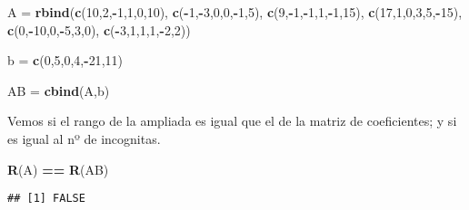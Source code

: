 \documentclass[
]{article}
\newenvironment{Shaded}{\begin{snugshade}}{\end{snugshade}}
\newcommand{\DecValTok}[1]{\textcolor[rgb]{0.00,0.00,0.81}{#1}}
\newcommand{\KeywordTok}[1]{\textcolor[rgb]{0.13,0.29,0.53}{\textbf{#1}}}
\newcommand{\NormalTok}[1]{#1}
\newcommand{\OperatorTok}[1]{\textcolor[rgb]{0.81,0.36,0.00}{\textbf{#1}}}
\newcommand{\StringTok}[1]{\textcolor[rgb]{0.31,0.60,0.02}{#1}}
\begin{document}
\begin{Shaded}
\begin{Highlighting}[]
\NormalTok{A =}\StringTok{ }\KeywordTok{rbind}\NormalTok{(}\KeywordTok{c}\NormalTok{(}\DecValTok{10}\NormalTok{,}\DecValTok{2}\NormalTok{,}\OperatorTok{-}\DecValTok{1}\NormalTok{,}\DecValTok{1}\NormalTok{,}\DecValTok{0}\NormalTok{,}\DecValTok{10}\NormalTok{), }\KeywordTok{c}\NormalTok{(}\OperatorTok{-}\DecValTok{1}\NormalTok{,}\OperatorTok{-}\DecValTok{3}\NormalTok{,}\DecValTok{0}\NormalTok{,}\DecValTok{0}\NormalTok{,}\OperatorTok{-}\DecValTok{1}\NormalTok{,}\DecValTok{5}\NormalTok{), }\KeywordTok{c}\NormalTok{(}\DecValTok{9}\NormalTok{,}\OperatorTok{-}\DecValTok{1}\NormalTok{,}\OperatorTok{-}\DecValTok{1}\NormalTok{,}\DecValTok{1}\NormalTok{,}\OperatorTok{-}\DecValTok{1}\NormalTok{,}\DecValTok{15}\NormalTok{), }\KeywordTok{c}\NormalTok{(}\DecValTok{17}\NormalTok{,}\DecValTok{1}\NormalTok{,}\DecValTok{0}\NormalTok{,}\DecValTok{3}\NormalTok{,}\DecValTok{5}\NormalTok{,}\OperatorTok{-}\DecValTok{15}\NormalTok{), }\KeywordTok{c}\NormalTok{(}\DecValTok{0}\NormalTok{,}\OperatorTok{-}\DecValTok{10}\NormalTok{,}\DecValTok{0}\NormalTok{,}\OperatorTok{-}\DecValTok{5}\NormalTok{,}\DecValTok{3}\NormalTok{,}\DecValTok{0}\NormalTok{), }\KeywordTok{c}\NormalTok{(}\OperatorTok{-}\DecValTok{3}\NormalTok{,}\DecValTok{1}\NormalTok{,}\DecValTok{1}\NormalTok{,}\DecValTok{1}\NormalTok{,}\OperatorTok{-}\DecValTok{2}\NormalTok{,}\DecValTok{2}\NormalTok{))}

\NormalTok{b =}\StringTok{ }\KeywordTok{c}\NormalTok{(}\DecValTok{0}\NormalTok{,}\DecValTok{5}\NormalTok{,}\DecValTok{0}\NormalTok{,}\DecValTok{4}\NormalTok{,}\OperatorTok{-}\DecValTok{21}\NormalTok{,}\DecValTok{11}\NormalTok{)}

\NormalTok{AB =}\StringTok{ }\KeywordTok{cbind}\NormalTok{(A,b)}
\end{Highlighting}
\end{Shaded}

Vemos si el rango de la ampliada es igual que el de la matriz de
coeficientes; y si es igual al nº de incognitas.

\begin{Shaded}
\begin{Highlighting}[]
\KeywordTok{R}\NormalTok{(A) }\OperatorTok{==}\StringTok{ }\KeywordTok{R}\NormalTok{(AB)}
\end{Highlighting}
\end{Shaded}

\begin{verbatim}
## [1] FALSE
\end{verbatim}
\end{document}
